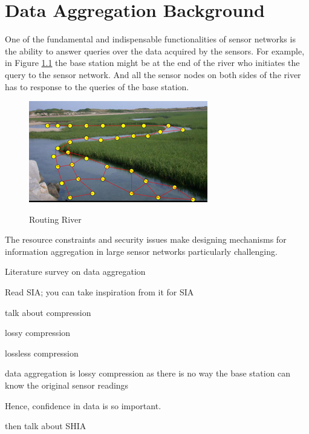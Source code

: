 \chapter{Data Aggregation Background} %
\label{cha:Data Aggregation Background}

One of the fundamental and indispensable functionalities of sensor networks
is the ability to answer queries over the data acquired by the
sensors. 
For example, in Figure \ref{fig:Routing River} the base station might be at the end of the river who initiates the query to the sensor network.
And all the sensor nodes on both sides of the river has to response to the queries of the base station.
\begin{figure}[h!]
	\centering
	\includegraphics[scale = 2]{images/routing-river.jpg}\\
	\caption{Routing River \cite{RoutingRiver}}
	\label{fig:Routing River}
\end{figure}

The resource constraints and security issues make designing mechanisms for information aggregation in large sensor networks particularly challenging.

Literature survey on data aggregation
	
	Read SIA; you can take inspiration from it for SIA

	talk about compression

	lossy compression

	lossless compression

	data aggregation is lossy compression as there is no way the base station can know the original sensor readings 

	Hence, confidence in data is so important.

then talk about SHIA
